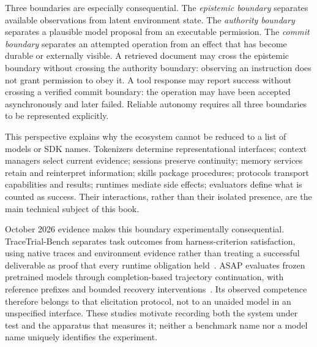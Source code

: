 Three boundaries are especially consequential. The \emph{epistemic boundary} separates available observations from latent environment state. The \emph{authority boundary} separates a plausible model proposal from an executable permission. The \emph{commit boundary} separates an attempted operation from an effect that has become durable or externally visible. A retrieved document may cross the epistemic boundary without crossing the authority boundary: observing an instruction does not grant permission to obey it. A tool response may report success without crossing a verified commit boundary: the operation may have been accepted asynchronously and later failed. Reliable autonomy requires all three boundaries to be represented explicitly.

This perspective explains why the ecosystem cannot be reduced to a list of models or SDK names. Tokenizers determine representational interfaces; context managers select current evidence; sessions preserve continuity; memory services retain and reinterpret information; skills package procedures; protocols transport capabilities and results; runtimes mediate side effects; evaluators define what is counted as success. Their interactions, rather than their isolated presence, are the main technical subject of this book.

October 2026 evidence makes this boundary experimentally consequential. TraceTrial-Bench separates task outcomes from harness-criterion satisfaction, using native traces and environment evidence rather than treating a successful deliverable as proof that every runtime obligation held~\cite{ch01_tracetrial2026}. ASAP evaluates frozen pretrained models through completion-based trajectory continuation, with reference prefixes and bounded recovery interventions~\cite{ch01_asap2026}. Its observed competence therefore belongs to that elicitation protocol, not to an unaided model in an unspecified interface. These studies motivate recording both the system under test and the apparatus that measures it; neither a benchmark name nor a model name uniquely identifies the experiment.

